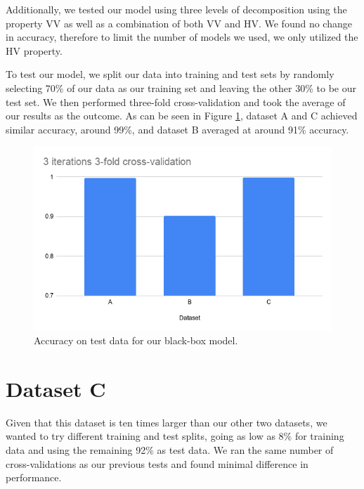 \documentclass{turabian-thesis}
\begin{document}
Additionally, we tested our model using three levels of decomposition using the property VV as well as a combination of both VV and HV. We found no change in accuracy, therefore to limit the number of models we used, we only utilized the HV property.


To test our model, we split our data into training and test sets by randomly selecting 70\% of our data as our training set and leaving the other 30\% to be our test set. We then performed three-fold cross-validation and took the average of our results as the outcome. As can be seen in Figure \ref{fig:final_results}, dataset A and C achieved similar accuracy, around 99\%, and dataset B averaged at around 91\% accuracy.


\begin{figure}[h!]
   \begin{center}
      \includegraphics[scale=0.6]{../media/results.png}
   \end{center}
   \caption{Accuracy on test data for our black-box model.}
   \label{fig:final_results}
\end{figure}

\section{Dataset C}

Given that this dataset is ten times larger than our other two datasets, we wanted to try different training and test splits, going as low as 8\% for training data and using the remaining 92\% as test data. We ran the same number of cross-validations as our previous tests and found minimal difference in performance.


\end{document}
